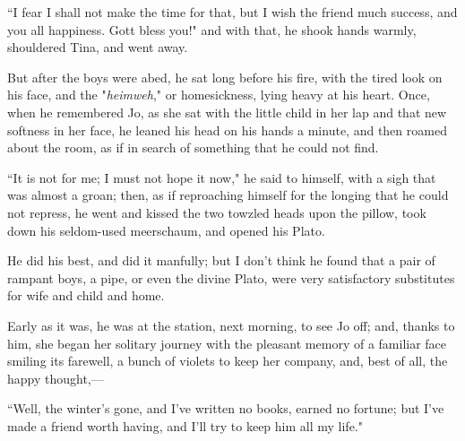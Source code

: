 ``I fear I shall not make the time for that, but I wish the friend much
success, and you all happiness. Gott bless you!" and with that, he shook
hands warmly, shouldered Tina, and went away.

But after the boys were abed, he sat long before his fire, with the
tired look on his face, and the "\emph{heimweh}," or homesickness, lying
heavy at his heart. Once, when he remembered Jo, as she sat with the
little child in her lap and that new softness in her face, he leaned his
head on his hands a minute, and then roamed about the room, as if in
search of something that he could not find.

``It is not for me; I must not hope it now," he said to himself, with a
sigh that was almost a groan; then, as if reproaching himself for the
longing that he could not repress, he went and kissed the two towzled
heads upon the pillow, took down his seldom-used meerschaum, and opened
his Plato.

He did his best, and did it manfully; but I don't think
he found that a pair of rampant boys, a pipe, or even the divine Plato,
were very satisfactory substitutes for wife and child and home.

Early as it was, he was at the station, next morning, to see Jo off;
and, thanks to him, she began her solitary journey with the pleasant
memory of a familiar face smiling its farewell, a bunch of violets to
keep her company, and, best of all, the happy thought,---

``Well, the winter's gone, and I've
written no books, earned no fortune; but I've made a
friend worth having, and I'll try to keep him all my
life."
